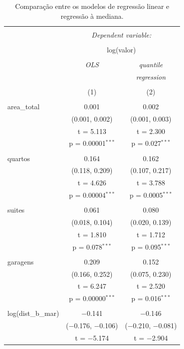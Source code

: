 \documentclass[a4paper, 12pt]{article}
\begin{document}
\begin{table}[!htbp] \centering 
  \caption{Comparação entre os modelos de regressão linear e regressão à mediana.} 
  \label{tab:fits} 
\begin{tabular}{@{\extracolsep{5pt}}lcc} 
\\[-1.8ex]\hline 
\hline \\[-1.8ex] 
 & \multicolumn{2}{c}{\textit{Dependent variable:}} \\ 
\cline{2-3} 
\\[-1.8ex] & \multicolumn{2}{c}{log(valor)} \\ 
\\[-1.8ex] & \textit{OLS} & \textit{quantile} \\ 
 & \textit{} & \textit{regression} \\ 
\\[-1.8ex] & (1) & (2)\\ 
\hline \\[-1.8ex] 
 area\_total & 0.001 & 0.002 \\ 
  & (0.001, 0.002) & (0.001, 0.003) \\ 
  & t = 5.113 & t = 2.300 \\ 
  & p = 0.00001$^{***}$ & p = 0.027$^{***}$ \\ 
  & & \\ 
 quartos & 0.164 & 0.162 \\ 
  & (0.118, 0.209) & (0.107, 0.217) \\ 
  & t = 4.626 & t = 3.788 \\ 
  & p = 0.00004$^{***}$ & p = 0.0005$^{***}$ \\ 
  & & \\ 
 suites & 0.061 & 0.080 \\ 
  & (0.018, 0.104) & (0.020, 0.139) \\ 
  & t = 1.810 & t = 1.712 \\ 
  & p = 0.078$^{***}$ & p = 0.095$^{***}$ \\ 
  & & \\ 
 garagens & 0.209 & 0.152 \\ 
  & (0.166, 0.252) & (0.075, 0.230) \\ 
  & t = 6.247 & t = 2.520 \\ 
  & p = 0.00000$^{***}$ & p = 0.016$^{***}$ \\ 
  & & \\ 
 log(dist\_b\_mar) & $-$0.141 & $-$0.146 \\ 
  & ($-$0.176, $-$0.106) & ($-$0.210, $-$0.081) \\ 
  & t = $-$5.174 & t = $-$2.904 \\ 

\end{tabular}
\end{table}
\end{document}
